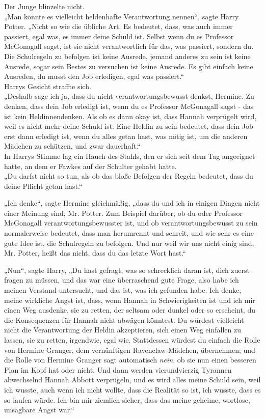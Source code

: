 {Der Junge blinzelte nicht.\\ „Man könnte es vielleicht heldenhafte Verantwortung nennen“, sagte Harry Potter. „Nicht so wie die übliche Art. Es bedeutet, dass, was auch immer passiert, egal was, es immer deine Schuld ist. Selbst wenn du es Professor McGonagall sagst, ist sie nicht verantwortlich für das, was passiert, sondern du. Die Schulregeln zu befolgen ist keine Ausrede, jemand anderes zu sein ist keine Ausrede, sogar sein Bestes zu versuchen ist keine Ausrede. Es gibt einfach keine Ausreden, du musst den Job erledigen, egal was passiert.“\\ Harrys Gesicht straffte sich.\\ „Deshalb sage ich ja, dass du nicht verantwortungsbewusst denkst, Hermine. Zu denken, dass dein Job erledigt ist, wenn du es Professor McGonagall sagst - das ist kein Heldinnendenken. Als ob es dann okay ist, dass Hannah verprügelt wird, weil es nicht mehr deine Schuld ist. Eine Heldin zu sein bedeutet, dass dein Job erst dann erledigt ist, wenn du alles getan hast, was nötig ist, um die anderen Mädchen zu schützen, und zwar dauerhaft.“\\ In Harrys Stimme lag ein Hauch des Stahls, den er sich seit dem Tag angeeignet hatte, an dem er Fawkes auf der Schulter gehabt hatte.\\ „Du darfst nicht so tun, als ob das bloße Befolgen der Regeln bedeutet, dass du deine Pflicht getan hast.“

„Ich denke“, sagte Hermine gleichmäßig, „dass du und ich in einigen Dingen nicht einer Meinung sind, Mr. Potter. Zum Beispiel darüber, ob du oder Professor McGonagall verantwortungsbewusster ist, und ob verantwortungsbewusst zu sein normalerweise bedeutet, dass man herumrennt und schreit, und wie sehr es eine gute Idee ist, die Schulregeln zu befolgen. Und nur weil wir uns nicht einig sind, Mr. Potter, heißt das nicht, dass du das letzte Wort hast.“

„Nun“, sagte Harry, „Du hast gefragt, was so schrecklich daran ist, dich zuerst fragen zu müssen, und das war eine überraschend gute Frage, also habe ich meinen Verstand untersucht, und das ist, was ich gefunden habe. Ich denke, meine wirkliche Angst ist, dass, wenn Hannah in Schwierigkeiten ist und ich mir einen Weg ausdenke, sie zu retten, der seltsam oder dunkel oder so erscheint, du die Konsequenzen für Hannah nicht abwägen könntest. Du würdest vielleicht nicht die Verantwortung der Heldin akzeptieren, sich einen Weg einfallen zu lassen, sie zu retten, irgendwie, egal wie. Stattdessen würdest du einfach die Rolle von Hermine Granger, dem vernünftigen Ravenclaw-Mädchen, übernehmen; und die Rolle von Hermine Granger sagt automatisch \emph{nein}, ob sie nun einen besseren Plan im Kopf hat oder nicht. Und dann werden vierundvierzig Tyrannen abwechselnd Hannah Abbott verprügeln, und es wird alles meine Schuld sein, weil ich wusste, auch wenn ich nicht wollte, dass die Realität so ist, ich wusste, dass es so laufen würde. Ich bin mir ziemlich sicher, dass das meine geheime, wortlose, unsagbare Angst war.“

}

